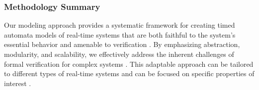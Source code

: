\subsubsection{Methodology Summary}
Our modeling approach provides a systematic framework for creating timed automata models of real-time systems that are both faithful to the system's essential behavior and amenable to verification \cite{alur1994theory,bengtsson2003timed}. By emphasizing abstraction, modularity, and scalability, we effectively address the inherent challenges of formal verification for complex systems \cite{clarke2018handbook,woodcock2009formal}. This adaptable approach can be tailored to different types of real-time systems and can be focused on specific properties of interest \cite{kopetz2022real,baier2008principles}.
